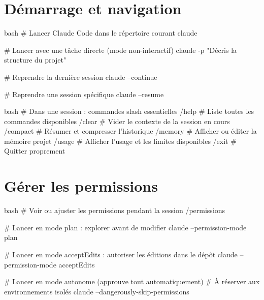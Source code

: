 


\section{Démarrage et navigation}


\begin{extraitcode}{bash}
# Lancer Claude Code dans le répertoire courant
claude

# Lancer avec une tâche directe (mode non-interactif)
claude -p "Décris la structure du projet"

# Reprendre la dernière session
claude --continue

# Reprendre une session spécifique
claude --resume
\end{extraitcode}

\begin{extraitcode}{bash}
# Dans une session : commandes slash essentielles
/help          # Liste toutes les commandes disponibles
/clear         # Vider le contexte de la session en cours
/compact       # Résumer et compresser l'historique
/memory        # Afficher ou éditer la mémoire projet
/usage         # Afficher l'usage et les limites disponibles
/exit          # Quitter proprement
\end{extraitcode}

\section{Gérer les permissions}


\begin{extraitcode}{bash}
# Voir ou ajuster les permissions pendant la session
/permissions

# Lancer en mode plan : explorer avant de modifier
claude --permission-mode plan

# Lancer en mode acceptEdits : autoriser les éditions dans le dépôt
claude --permission-mode acceptEdits

# Lancer en mode autonome (approuve tout automatiquement)
# À réserver aux environnements isolés
claude --dangerously-skip-permissions
\end{extraitcode}

